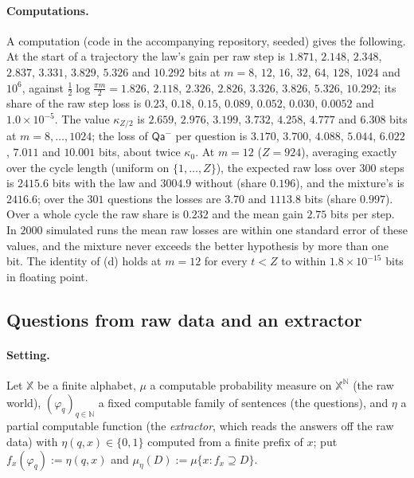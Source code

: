 \paragraph{Computations.}
A computation (code in the accompanying repository, seeded) gives the following. At the start of a trajectory the law's gain per raw step is $1.871$, $2.148$, $2.348$, $2.837$, $3.331$, $3.829$, $5.326$ and $10.292$ bits at $m=8$, $12$, $16$, $32$, $64$, $128$, $1024$ and $10^6$, against $\frac12\log\frac{\pi m}2=1.826$, $2.118$, $2.326$, $2.826$, $3.326$, $3.826$, $5.326$, $10.292$; its share of the raw step loss is $0.23$, $0.18$, $0.15$, $0.089$, $0.052$, $0.030$, $0.0052$ and $1.0\times10^{-5}$. The value $\kappa_{Z/2}$ is $2.659$, $2.976$, $3.199$, $3.732$, $4.258$, $4.777$ and $6.308$ bits at $m=8,\dots,1024$; the loss of $\mathsf{Qa}^-$ per question is $3.170$, $3.700$, $4.088$, $5.044$, $6.022$, $7.011$ and $10.001$ bits, about twice $\kappa_0$. At $m=12$ ($Z=924$), averaging exactly over the cycle length (uniform on $\{1,\dots,Z\}$), the expected raw loss over $300$ steps is $2415.6$ bits with the law and $3004.9$ without (share $0.196$), and the mixture's is $2416.6$; over the $301$ questions the losses are $3.70$ and $1113.8$ bits (share $0.997$). Over a whole cycle the raw share is $0.232$ and the mean gain $2.75$ bits per step. In $2000$ simulated runs the mean raw losses are within one standard error of these values, and the mixture never exceeds the better hypothesis by more than one bit. The identity of (d) holds at $m=12$ for every $t<Z$ to within $1.8\times10^{-15}$ bits in floating point.

\subsection{Questions from raw data and an extractor}\label{app:phil:extractor}

\paragraph{Setting.} Let $\mathbb X$ be a finite alphabet, $\mu$ a computable probability measure on $\mathbb X^{\mathbb N}$ (the raw world), $(\varphi_q)_{q\in\mathbb N}$ a fixed computable family of sentences (the questions), and $\eta$ a partial computable function (the \emph{extractor}, which reads the answers off the raw data) with $\eta(q,x)\in\{0,1\}$ computed from a finite prefix of $x$; put $f_x(\varphi_q):=\eta(q,x)$ and $\mu_\eta(D):=\mu\{x:f_x\supseteq D\}$.

